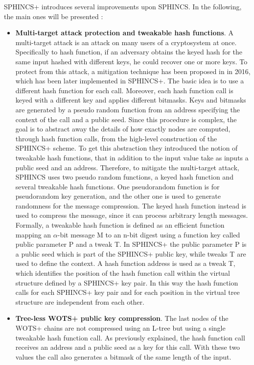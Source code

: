\documentclass[a4paper,12pt]{article}
\begin{document}
SPHINCS+ introduces several improvements upon SPHINCS. In the following, the main ones will be presented \cite{2_SPHINCS+_round2}\cite{3_SPHINCS_secondpaper}:
\begin{itemize}
	\item \textbf{Multi-target attack protection and tweakable hash functions}. A multi-target attack is an attack on many users of a cryptosystem at once. Specifically to hash function, if an adversary obtains the keyed hash for the same input hashed with different keys, he could recover one or more keys. To protect from this attack, a mitigation technique has been proposed in \cite{51_MultiTarget} in 2016, which has been later implemented in SPHINCS+.
	The basic idea is to use a different hash function for each call. Moreover, each hash function call is keyed with a different key and applies different bitmasks. Keys and bitmasks are generated by a pseudo random function from an address specifying the context of the call and a public seed.
	Since this procedure is complex, the goal is to abstract away the details of how exactly nodes are computed, through hash function calls, from the high-level construction of the SPHINCS+ scheme.
	To get this abstraction they introduced the notion of tweakable hash functions, that in addition to the input value take as inputs a public seed and an address.
	Therefore, to mitigate the multi-target attack, SPHINCS uses two pseudo random functions, a keyed hash function and several tweakable hash functions. One pseudorandom function is for pseudorandom key generation, and the other one is used to generate randomness for the message compression.
	The keyed hash function instead is used to compress the message, since it can process arbitrary length messages.
	Formally, a tweakable hash function is defined as an efficient function mapping an $\alpha$-bit message M to an n-bit digest using a function key called public parameter P and a tweak T. In SPHINCS+ the public parameter P is a public seed which is part of the SPHINCS+ public key, while tweaks T are used to define the context. A hash function address is used as a tweak T, which identifies the position of the hash function call within the virtual structure defined by a SPHINCS+ key pair. In this way the hash function calls for each SPHINCS+ key pair and for each position in the virtual tree structure are independent from each other.
	\item \textbf{Tree-less WOTS+ public key compression}. The last nodes of the WOTS+ chains are not compressed using an L-tree but using a single tweakable hash function call. As previously explained, the hash function call receives an address and a public seed as a key for this call. With these two values the call also generates a bitmask of the same length of the input.

\end{itemize}
\end{document}

